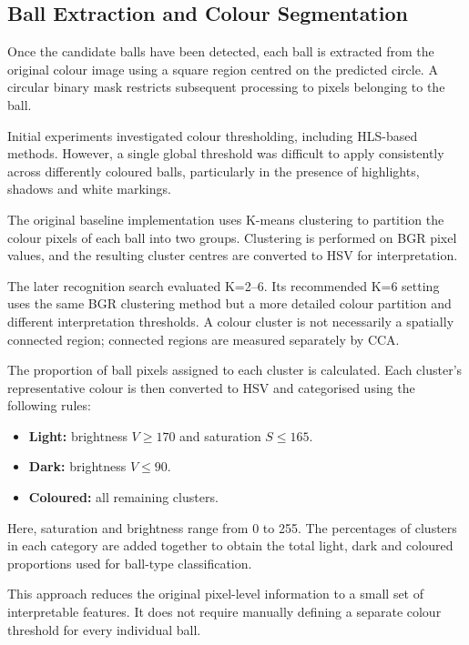 \documentclass[10pt,a4paper]{article}
\begin{document}
\subsection{Ball Extraction and Colour Segmentation}

Once the candidate balls have been detected, each ball is extracted from the 
original colour image using a square region centred on the predicted circle. 
A circular binary mask restricts subsequent processing to pixels belonging to 
the ball.

Initial experiments investigated colour thresholding, including HLS-based 
methods. However, a single global threshold was difficult to apply 
consistently across differently coloured balls, particularly in the presence 
of highlights, shadows and white markings.

The original baseline implementation uses K-means clustering to partition the
colour pixels of each ball into two groups. Clustering is performed on BGR 
pixel values, and the resulting cluster centres are converted to HSV for 
interpretation.

The later recognition search evaluated K=2--6. Its recommended K=6 setting
uses the same BGR clustering method but a more detailed colour partition and
different interpretation thresholds. A colour cluster is not necessarily
a spatially connected region; connected regions are measured separately by CCA.

The proportion of ball pixels assigned to each cluster is calculated.
Each cluster's representative colour is then converted to HSV and
categorised using the following rules:

\begin{itemize}
    \item \textbf{Light:} brightness $V \geq 170$ and
          saturation $S \leq 165$.
    \item \textbf{Dark:} brightness $V \leq 90$.
    \item \textbf{Coloured:} all remaining clusters.
\end{itemize}

Here, saturation and brightness range from 0 to 255. The percentages
of clusters in each category are added together to obtain the total
light, dark and coloured proportions used for ball-type classification.

This approach reduces the original pixel-level information to a small set of 
interpretable features. It does not require manually defining a separate colour 
threshold for every individual ball.
\end{document}

